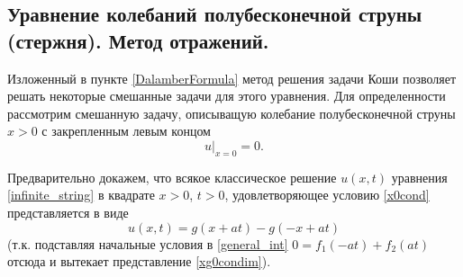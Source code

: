 \subsection{Уравнение колебаний полубесконечной струны (стержня). Метод отражений.}


Изложенный в пункте \ref{DalamberFormula} метод решения задачи Коши позволяет решать некоторые смешанные задачи для этого уравнения. Для определенности рассмотрим смешанную задачу, описыващую колебание полубесконечной струны $x > 0$ с закрепленным левым концом
\begin{equation} \label{x0cond}
	u |_{x = 0} = 0.
\end{equation}

Предварительно докажем, что всякое классическое решение $u(x, t)$ уравнения \eqref{infinite_string} в квадрате $x > 0$, $t > 0$, удовлетворяющее условию \eqref{x0cond} представляется в виде 
\begin{equation} \label{xg0condim}
	u(x, t) = g(x + a t) - g(-x + a t)
\end{equation}
(т.к. подставляя начальные условия в \eqref{general_int} $0 = f_1(-a t) + f_2(a t)$
отсюда и вытекает представление \eqref{xg0condim}).


